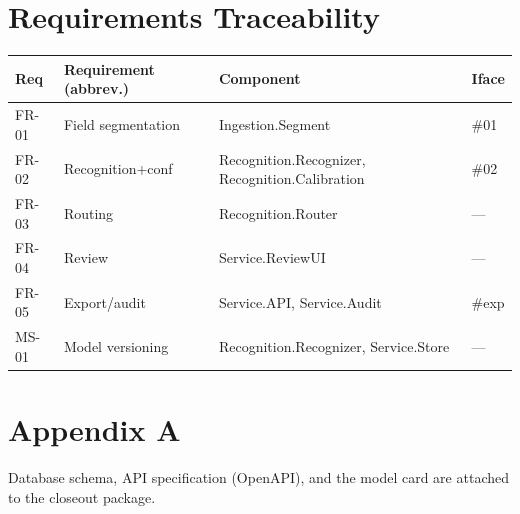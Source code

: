 \documentclass[11pt,letterpaper]{article}
\begin{document}
\section{Requirements Traceability}
\begin{table}[H]\begin{center}\begin{tabular}{ | p{1.6cm} | p{5cm} | p{3.4cm} | p{1.6cm} |}\hline
\textbf{Req} & \textbf{Requirement (abbrev.)} & \textbf{Component} & \textbf{Iface} \\ \hline
FR-01 & Field segmentation & Ingestion.Segment & \#01 \\ \hline
FR-02 & Recognition+conf & Recognition.Recognizer, Recognition.Calibration & \#02 \\ \hline
FR-03 & Routing & Recognition.Router & --- \\ \hline
FR-04 & Review & Service.ReviewUI & --- \\ \hline
FR-05 & Export/audit & Service.API, Service.Audit & \#exp \\ \hline
MS-01 & Model versioning & Recognition.Recognizer, Service.Store & --- \\ \hline
\end{tabular}\end{center}\end{table}

\section{Appendix A}
Database schema, API specification (OpenAPI), and the model card are attached to the
closeout package.


{}
\end{document}
